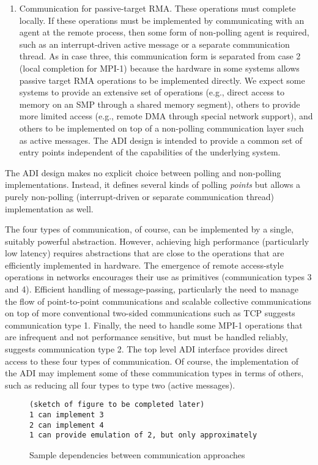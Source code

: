 \documentclass{article}
\begin{document}
\begin{enumerate}
\item Communication for passive-target RMA.  These operations
must complete locally.  If these operations must be implemented by
communicating with an agent at the remote process, then some form of
non-polling agent is required, such as an interrupt-driven active
message or a separate communication thread.  As in case three, this
communication form is separated from case 2 (local completion for
MPI-1) because the hardware in some systems allows passive target RMA
operations to be implemented directly.  We expect some systems to
provide an extensive set of operations (e.g., direct access to memory
on an SMP through a shared memory segment), others to provide more
limited access (e.g., remote DMA through special network support), and
others to be implemented on top of a non-polling communication layer
such as active messages.  The ADI design is intended to provide a
common set of entry points independent of the capabilities of the
underlying system.

\end{enumerate}

The ADI design makes no explicit choice between polling and
non-polling implementations.  Instead, it defines several kinds of
polling \emph{points} but allows a purely non-polling
(interrupt-driven or separate communication thread) implementation as well.

The four types of communication, of course, can be implemented by a
single, suitably powerful abstraction.  However, achieving high
performance (particularly low latency) requires abstractions that are
close to the operations that are efficiently implemented in hardware.
The emergence of remote access-style operations in networks
\cite{unet,via,infiniband} encourages their use as primitives
(communication types 3 and 4).  Efficient handling of message-passing,
particularly the need to manage the flow of point-to-point
communications and scalable collective communications on top of more
conventional two-sided communications such as TCP suggests
communication type 1.  Finally, the need to handle some MPI-1
operations that are infrequent and not performance sensitive, but must
be handled reliably, suggests communication type 2.  The top level ADI
interface provides direct access to these four types of communication.  Of
course, the implementation of the ADI may implement some of these
communication types in terms of others, such as reducing all four types to
type two (active messages).  

\begin{figure}
\begin{verbatim}
(sketch of figure to be completed later)
1 can implement 3
2 can implement 4
1 can provide emulation of 2, but only approximately
\end{verbatim}
\caption{Sample dependencies between communication approaches}
\label{fig:comm-depend}
\end{figure}
\end{document}
